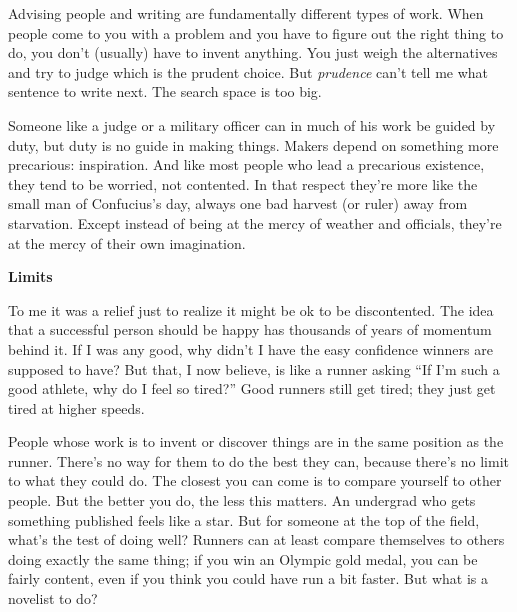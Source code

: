 Advising people and writing are fundamentally different types of work.
When people come to you with a problem and you have to figure out the
right thing to do, you don't (usually) have to invent anything. You just
weigh the alternatives and try to judge which is the prudent choice. But
\emph{prudence} can't tell me what sentence to write next. The search
space is too big.

Someone like a judge or a military officer can in much of his work be
guided by duty, but duty is no guide in making things. Makers depend on
something more precarious: inspiration. And like most people who lead a
precarious existence, they tend to be worried, not contented. In that
respect they're more like the small man of Confucius's day, always one
bad harvest (or ruler) away from starvation. Except instead of being at
the mercy of weather and officials, they're at the mercy of their own
imagination.

\textbf{Limits}

To me it was a relief just to realize it might be ok to be discontented.
The idea that a successful person should be happy has thousands of years
of momentum behind it. If I was any good, why didn't I have the easy
confidence winners are supposed to have? But that, I now believe, is
like a runner asking ``If I'm such a good athlete, why do I feel so
tired?'' Good runners still get tired; they just get tired at higher
speeds.

People whose work is to invent or discover things are in the same
position as the runner. There's no way for them to do the best they can,
because there's no limit to what they could do. The closest you can come
is to compare yourself to other people. But the better you do, the less
this matters. An undergrad who gets something published feels like a
star. But for someone at the top of the field, what's the test of doing
well? Runners can at least compare themselves to others doing exactly
the same thing; if you win an Olympic gold medal, you can be fairly
content, even if you think you could have run a bit faster. But what is
a novelist to do?


